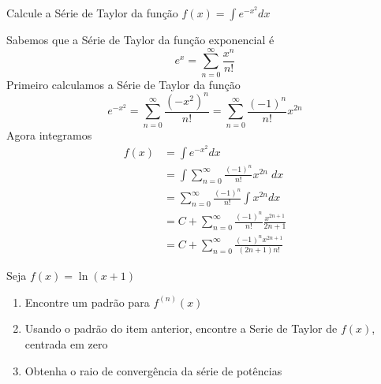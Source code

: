 \documentclass[a4paper,12pt,fleqn]{article}
\begin{document}

Calcule a Série de Taylor da função
\(
  f(x) = \int e^{-x^2} dx
\)

\begin{answer}
  Sabemos que a Série de Taylor da função exponencial é
  \[
    e^x = \sum_{n=0}^\infty \frac{x^n}{n!}
  \]
  Primeiro calculamos a Série de Taylor da função
  \[
    e^{-x^2}
    = \sum_{n=0}^\infty \frac{\left(-x^2\right)^n}{n!}
    = \sum_{n=0}^\infty \frac{(-1)^n}{n!} x^{2n}
  \]
  Agora integramos
  \begin{align*}
    f(x)
    & = \int e^{-x^2} dx \\[2mm]
    & = \int \sum_{n=0}^\infty \frac{(-1)^n}{n!} x^{2n} \;dx \\[2mm]
    & = \sum_{n=0}^\infty \frac{(-1)^n}{n!} \int x^{2n} dx \\[2mm]
    & = C + \sum_{n=0}^\infty \frac{(-1)^n}{n!} \frac{x^{2n+1}}{2n+1} \\[2mm]
    & = C + \sum_{n=0}^\infty \frac{(-1)^nx^{2n+1}}{(2n+1)n!}
  \end{align*}
\end{answer}

Seja \( f(x) = \ln(x+1)\)
\begin{enumerate}
  \item[{a) [12]}] Encontre um padrão para \(f^{(n)}(x)\)
  \item[{b) [14]}] Usando o padrão do item anterior, encontre a
                   Serie de Taylor de $f(x)$, centrada em zero
  \item[{c) [14]}] Obtenha o raio de convergência da série de potências
\end{enumerate}
\end{document}
